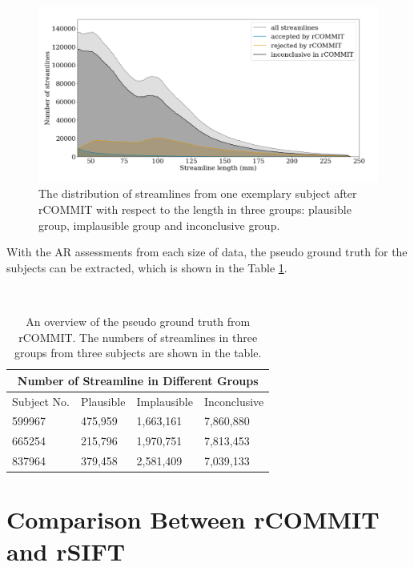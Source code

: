 \begin{figure}[ht]
    \centering
    \includegraphics[width= 12cm]{figures/three_groups_hist.png}
        \caption{The distribution of streamlines from one exemplary subject after rCOMMIT with respect to the length in three groups: plausible group, implausible group and inconclusive group. }
    \label{fig:threegroup}
\end{figure}

With the AR assessments from each size of data, 
the pseudo ground truth for the subjects can be extracted, which is shown in the Table \ref{table:pgt}.



\begin{table}[!ht]
    \centering
    \caption{An overview of the pseudo ground truth from rCOMMIT. The numbers of streamlines in three groups from three subjects are shown in the table. }
    ~\\
    \label{table:pgt}
    \begin{tabular}{p{3cm}|p{3cm}|p{3cm}|p{3cm}}
    \toprule
    \multicolumn{4}{c}{\textbf{Number of Streamline in Different Groups}} \\
    \toprule
    Subject No. & Plausible &Implausible & Inconclusive \\
    \hline
    599967 & 475,959 &1,663,161 & 7,860,880 \\
    \hline
    665254 & 215,796 &1,970,751 & 7,813,453 \\
    \hline
    837964 & 379,458 &2,581,409 & 7,039,133 \\
    \bottomrule
    \end{tabular}
\end{table}

\section{Comparison Between rCOMMIT and rSIFT}

